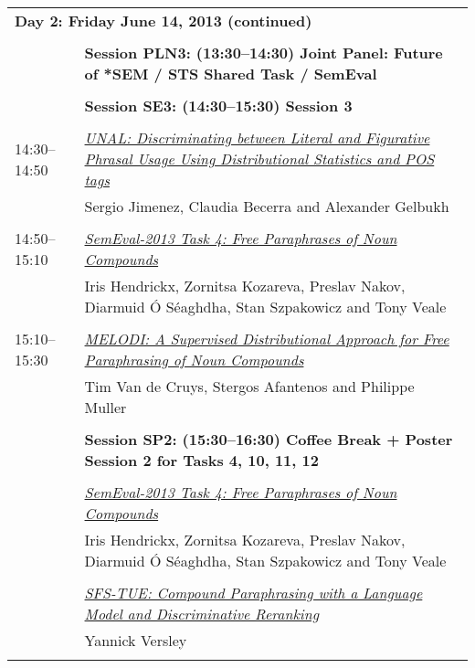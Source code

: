 \begin{tabular}{p{20mm}p{138mm}}
\\
\multicolumn{2}{l}{\bf Day 2: Friday June 14, 2013 (continued)} \\\\
 & {\bf Session PLN3: (13:30--14:30) Joint Panel: Future of *SEM / STS Shared Task / SemEval} \\
\\
 & {\bf Session SE3: (14:30--15:30) Session 3} \\
\\

14:30--14:50 & \hyperlink{page.114}{\em UNAL: Discriminating between Literal and Figurative Phrasal Usage Using Distributional Statistics and POS tags}\\
         & Sergio Jimenez, Claudia Becerra and Alexander Gelbukh \\
\\

14:50--15:10 & \hyperlink{page.138}{\em SemEval-2013 Task 4: Free Paraphrases of Noun Compounds}\\
         & Iris Hendrickx, Zornitsa Kozareva, Preslav Nakov, Diarmuid \'{O} S\'{e}aghdha, Stan Szpakowicz and Tony Veale \\
\\

15:10--15:30 & \hyperlink{page.144}{\em MELODI: A Supervised Distributional Approach for Free Paraphrasing of Noun Compounds}\\
         & Tim Van de Cruys, Stergos Afantenos and Philippe Muller \\
\\

 & {\bf Session SP2: (15:30--16:30) Coffee Break + Poster Session 2 for Tasks 4, 10, 11, 12} \\
\\

& \hyperlink{page.138}{\em SemEval-2013 Task 4: Free Paraphrases of Noun Compounds}\\
         & Iris Hendrickx, Zornitsa Kozareva, Preslav Nakov, Diarmuid \'{O} S\'{e}aghdha, Stan Szpakowicz and Tony Veale \\
\\

 & \hyperlink{page.148}{\em SFS-TUE: Compound Paraphrasing with a Language Model and Discriminative Reranking}\\
         & Yannick Versley \\
\\


\end{tabular}
